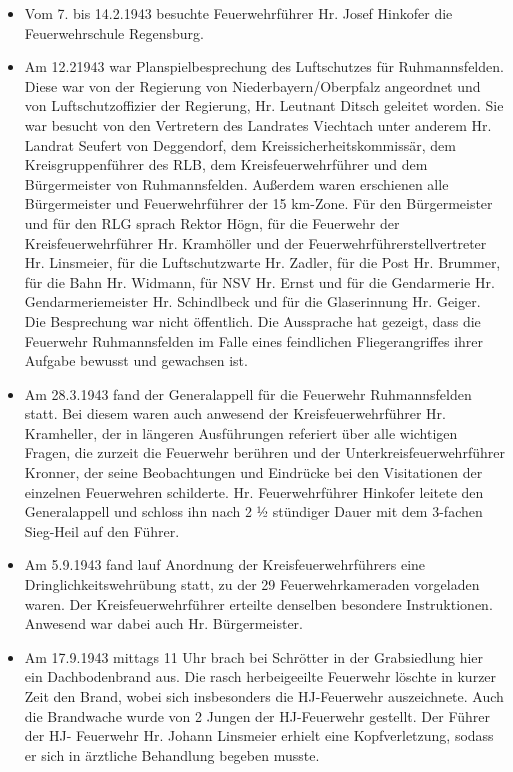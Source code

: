 \documentclass[12pt,a4paper]{book}
\begin{document}
\begin{itemize}
\item Vom 7. bis 14.2.1943 besuchte Feuerwehrführer Hr. Josef Hinkofer
die Feuerwehrschule Regensburg.

\item Am 12.21943 war Planspielbesprechung des Luftschutzes für
Ruhmannsfelden. Diese war von der Regierung von Niederbayern/Oberpfalz
angeordnet und von Luftschutzoffizier der Regierung, Hr. Leutnant Ditsch
geleitet worden. Sie war besucht von den Vertretern des Landrates
Viechtach unter anderem Hr. Landrat Seufert von Deggendorf, dem
Kreissicherheitskommissär, dem Kreisgruppenführer des RLB, dem
Kreisfeuerwehrführer und dem Bürgermeister von Ruhmannsfelden. Außerdem
waren erschienen alle Bürgermeister und Feuerwehrführer der 15 km-Zone.
Für den Bürgermeister und für den RLG sprach Rektor Högn, für die
Feuerwehr der Kreisfeuerwehrführer Hr. Kramhöller und der
Feuerwehrführerstellvertreter Hr. Linsmeier, für die Luftschutzwarte Hr.
Zadler, für die Post Hr. Brummer, für die Bahn Hr. Widmann, für NSV Hr.
Ernst und für die Gendarmerie Hr. Gendarmeriemeister Hr. Schindlbeck und
für die Glaserinnung Hr. Geiger. Die Besprechung war nicht öffentlich.
Die Aussprache hat gezeigt, dass die Feuerwehr Ruhmannsfelden im Falle
eines feindlichen Fliegerangriffes ihrer Aufgabe bewusst und gewachsen
ist.

\item Am 28.3.1943 fand der Generalappell für die Feuerwehr
Ruhmannsfelden statt. Bei diesem waren auch anwesend der
Kreisfeuerwehrführer Hr. Kramheller, der in längeren Ausführungen
referiert über alle wichtigen Fragen, die zurzeit die Feuerwehr berühren
und der Unterkreisfeuerwehrführer Kronner, der seine Beobachtungen und
Eindrücke bei den Visitationen der einzelnen Feuerwehren schilderte. Hr.
Feuerwehrführer Hinkofer leitete den Generalappell und schloss ihn nach
2 ½ stündiger Dauer mit dem 3-fachen Sieg-Heil auf den Führer.

\item Am 5.9.1943 fand lauf Anordnung der Kreisfeuerwehrführers eine
Dringlichkeitswehrübung statt, zu der 29 Feuerwehrkameraden vorgeladen
waren. Der Kreisfeuerwehrführer erteilte denselben besondere
Instruktionen. Anwesend war dabei auch Hr. Bürgermeister.

\item Am 17.9.1943 mittags 11 Uhr brach bei Schrötter in der
Grabsiedlung hier ein Dachbodenbrand aus. Die rasch herbeigeeilte
Feuerwehr löschte in kurzer Zeit den Brand, wobei sich insbesonders die
HJ-Feuerwehr auszeichnete. Auch die Brandwache wurde von 2 Jungen der
HJ-Feuerwehr gestellt. Der Führer der HJ- Feuerwehr Hr. Johann Linsmeier
erhielt eine Kopfverletzung, sodass er sich in ärztliche Behandlung
begeben musste.
\end{itemize}
\end{document}
